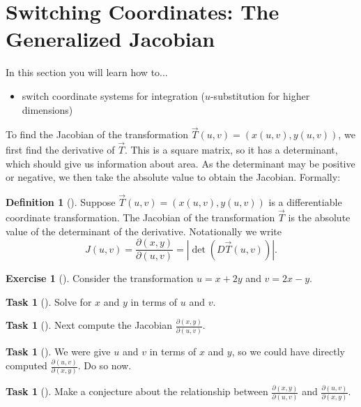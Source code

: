 \documentclass[10pt,]{book}
\theoremstyle{plain}
\theoremstyle{definition}
\newtheorem{definition}[theorem]{Definition}
\theoremstyle{definition}
\theoremstyle{definition}
\theoremstyle{definition}
\newtheorem{exploration}[project]{Exercise}
\newtheorem{task}[project]{Task}
\theoremstyle{definition}
\numberwithin{equation}{section}
\begin{document}
\section[{Switching Coordinates: The Generalized Jacobian}]{Switching Coordinates: The Generalized Jacobian}\label{section-40}
In this section you will learn how to... \leavevmode%
\begin{itemize}[label=\textbullet]
\item{}switch coordinate systems for integration (\(u\)-substitution for higher dimensions)%
\end{itemize}
%
\par
To find the Jacobian of the transformation \(\vec T(u,v)=(x(u,v), y(u,v))\), we first find the derivative of \(\vec T\). This is a square matrix, so it has a determinant, which should give us information about area. As the determinant may be positive or negative, we then take the absolute value to obtain the Jacobian. Formally:%
\begin{definition}[{}]\label{definition-43}
Suppose \(\vec T(u,v)=(x(u,v),y(u,v))\) is a differentiable coordinate transformation. The Jacobian of the transformation \(\vec T\) is the absolute value of the determinant of the derivative. Notationally we write%
\begin{equation*}
J(u,v) = \frac{\partial (x,y)}{\partial (u,v)} = |\det(D\vec T(u,v))|.
\end{equation*}
%
\end{definition}
\begin{exploration}[]\label{exploration-268}
Consider the transformation \(u=x+2y\) and \(v=2x-y\).%
\begin{task}[]\label{task-722}
Solve for \(x\) and \(y\) in terms of \(u\) and \(v\).%
\end{task}
\begin{task}[]\label{task-723}
Next compute the Jacobian \(\frac{\partial (x,y)}{\partial (u,v)}\).%
\end{task}
\begin{task}[]\label{task-724}
We were give \(u\) and \(v\) in terms of \(x\) and \(y\), so we could have directly computed \(\frac{\partial (u,v)}{\partial (x,y)}\). Do so now.%
\end{task}
\begin{task}[]\label{task-725}
Make a conjecture about the relationship between \(\frac{\partial (x,y)}{\partial (u,v)}\) and \(\frac{\partial (u,v)}{\partial (x,y)}\).%
\end{task}
\end{exploration}
\end{document}
